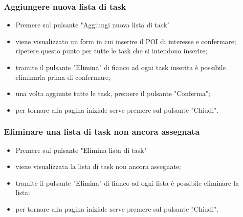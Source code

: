 \subsubsection{Aggiungere nuova lista di task}
\begin{itemize}
    \item Premere sul pulsante "Aggiungi nuova lista di task"
    \item viene visualizzato un form in cui inserire il POI di interesse e confermare; \\ripetere questo punto per tutte le task che si intendono inserire;
    \item tramite il pulsante "Elimina" di fianco ad ogni task inserita è possibile eliminarla prima di confermare;
    \item una volta aggiunte tutte le task, premere il pulsante "Conferma";
    \item per tornare alla pagina iniziale serve premere sul pulsante "Chiudi".
\end{itemize}
\subsubsection{Eliminare una lista di task non ancora assegnata}
\begin{itemize}
    \item Premere sul pulsante "Elimina lista di task"
    \item viene visualizzata la lista di task non ancora assegnate;
    \item tramite il pulsante "Elimina" di fianco ad ogni lista è possibile eliminare la lista;
    \item per tornare alla pagina iniziale serve premere sul pulsante "Chiudi".
\end{itemize}